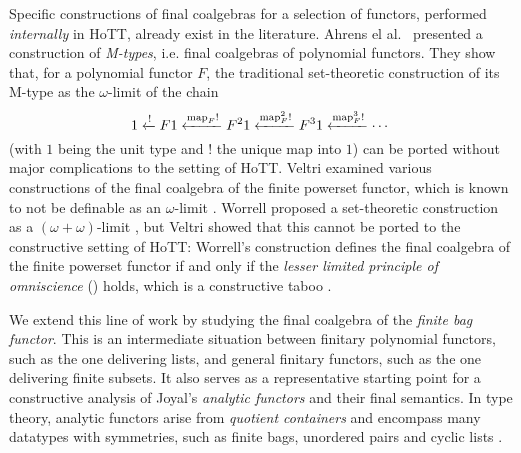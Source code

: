 \documentclass[final,a4paper,USenglish,cleveref]{lipics-v2021}
\begin{document}
Specific constructions of final coalgebras for a selection of functors, performed \emph{internally} in HoTT, already exist in the literature. Ahrens el al.~\cite{Ahrens2015} presented a construction of \emph{M-types}, i.e. final coalgebras of polynomial functors. They show that, for a polynomial functor $F$, the traditional set-theoretic construction of its M-type as the $\omega$-limit of the chain
\begin{equation}\label{eq:chain}
    1 \xleftarrow{!} {F 1}
      \xleftarrow{\Map{F} !} {F^2 1}
      \xleftarrow{\Map{F}^2 !} {F^3 1}
      \xleftarrow{\Map{F}^3 !}
      \cdots
\end{equation}
(with $1$ being the unit type and $!$ the unique map into $1$) can be ported without major complications to the setting of HoTT. Veltri \cite{Veltri2021} examined various constructions of the final coalgebra of the finite powerset functor, which is known to not be definable as an $\omega$-limit \cite{Adamek1995}. Worrell proposed a set-theoretic construction as a $(\omega+\omega)$-limit \cite{Worrell2005}, but Veltri showed that this cannot be ported to the constructive setting of HoTT: Worrell's construction defines the final coalgebra of the finite powerset functor if and only if the \emph{lesser limited principle of omniscience} (\LLPO{}) holds, which is a constructive taboo \cite{Bridges1987}.


We extend this line of work by studying the final coalgebra of the \emph{finite bag functor}. This is an intermediate situation between finitary polynomial functors, such as the one delivering lists, and general finitary functors, such as the one delivering finite subsets. It also serves as a representative starting point for a constructive analysis of Joyal's \emph{analytic functors} \cite{Joyal1986} and their final semantics. In type theory, analytic functors arise from \emph{quotient containers} \cite{Abbott2004} and encompass many datatypes with symmetries, such as finite bags, unordered pairs and cyclic lists \cite{Yorgey2010,Yorgey2014}.
\end{document}
